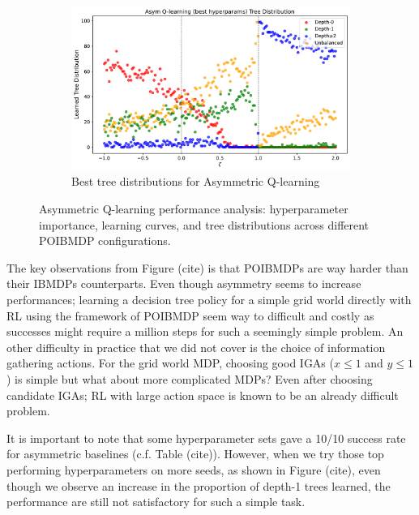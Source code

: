 \begin{figure}
\begin{subfigure}[b]{0.32\textwidth}
        \includegraphics[width=\textwidth]{images/images_part1/ql_asym_best_tree_distributions.pdf}
        \caption{Best tree distributions for Asymmetric Q-learning}
        \label{fig:best-tree-distributions}
    \end{subfigure}
    \caption{Asymmetric Q-learning performance analysis: hyperparameter importance, learning curves, and tree distributions across different POIBMDP configurations.}
    \label{fig:asym-ql-analysis}
\end{figure}


The key observations from Figure (cite) is that POIBMDPs are way harder than their IBMDPs counterparts.
Even though asymmetry seems to increase performances; learning a decision tree policy for a simple grid world directly with RL using the framework of POIBMDP seem way to difficult and costly as successes might require a million steps for such a seemingly simple problem.
An other difficulty in practice that we did not cover is the choice of information gathering actions.
For the grid world MDP, choosing good IGAs ($x\leq1$ and $y\leq1$) is simple but what about more complicated MDPs? 
Even after choosing candidate IGAs; RL with large action space is known to be an already difficult problem.

It is important to note that some hyperparameter sets gave a 10/10 success rate for asymmetric baselines (c.f. Table (cite)). 
However, when we try those top performing hyperparameters on more seeds, as shown in Figure (cite), even though we observe an increase in the proportion of depth-1 trees learned, the performance are still not satisfactory for such a simple task. 

